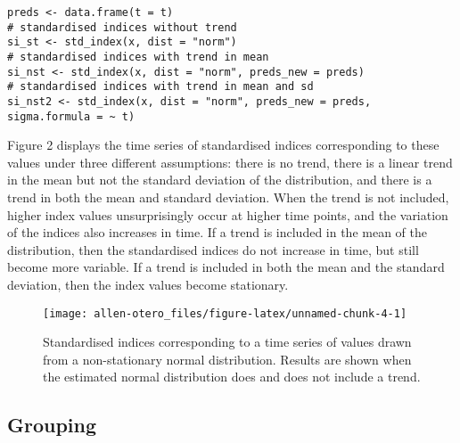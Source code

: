 \begin{verbatim}
preds <- data.frame(t = t)
# standardised indices without trend
si_st <- std_index(x, dist = "norm")
# standardised indices with trend in mean
si_nst <- std_index(x, dist = "norm", preds_new = preds)
# standardised indices with trend in mean and sd
si_nst2 <- std_index(x, dist = "norm", preds_new = preds, sigma.formula = ~ t)
\end{verbatim}

Figure 2 displays the time series of standardised indices corresponding to these values under three different assumptions: there is no trend, there is a linear trend in the mean but not the standard deviation of the distribution, and there is a trend in both the mean and standard deviation. When the trend is not included, higher index values unsurprisingly occur at higher time points, and the variation of the indices also increases in time. If a trend is included in the mean of the distribution, then the standardised indices do not increase in time, but still become more variable. If a trend is included in both the mean and the standard deviation, then the index values become stationary.

\begin{figure}

{\centering \texttt{[image: allen-otero\_files/figure-latex/unnamed-chunk-4-1]} 

}

\caption{Standardised indices corresponding to a time series of values drawn from a non-stationary normal distribution. Results are shown when the estimated normal distribution does and does not include a trend.}\label{fig:unnamed-chunk-4}
\end{figure}

\subsection{Grouping}\label{grouping}

